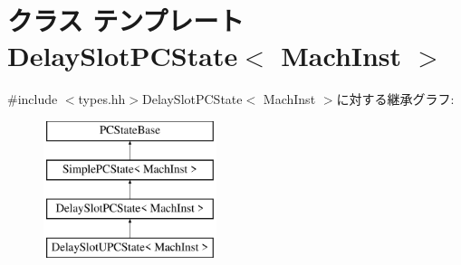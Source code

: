 \hypertarget{classGenericISA_1_1DelaySlotPCState}{
\section{クラス テンプレート DelaySlotPCState$<$ MachInst $>$}
\label{classGenericISA_1_1DelaySlotPCState}
}


{\ttfamily \#include $<$types.hh$>$}DelaySlotPCState$<$ MachInst $>$に対する継承グラフ:\begin{figure}[H]
\begin{center}
\leavevmode
\includegraphics[height=4cm]{classGenericISA_1_1DelaySlotPCState}
\end{center}
\end{figure}
